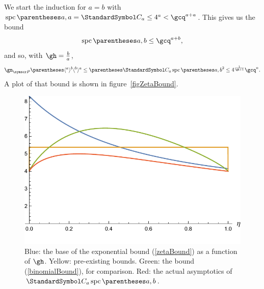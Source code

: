 We start the induction for $a=b$ with $\spc\of{a,a}=\CatalanNumber a \leq 4^{a} < \gcq^{a+a}$.
This gives us the bound\[
\spc\of{a,b}\leq\gcq^{a+b}\text,
\]
and so, with $\gh=\frac{b}{a}$,\begin{equation}
\gn_{\pointset P}\of{\langle^a\rangle^b\langle^b\rangle^a} \leq \pa{\CatalanNumber a \spc\of{a,b}}^2\leq 4^{\frac{1}{\gh+1}} \gcq^{n}\text.
\label{zetaBound}
\end{equation}
A plot of that bound is shown in figure~\ref{figZetaBound}.

\begin{figure}[htb!]
\includegraphics[scale=0.75]{spc-zeta-bound.pdf}
\caption{Blue: the base of the exponential bound (\ref{zetaBound}) as a function of $\gh$. Yellow: pre-existing bounds.
Green: the bound (\ref{binomialBound}), for comparison. Red: the actual asymptotics of $\CatalanNumber a \spc\of{a,b}$.}
\end{figure}